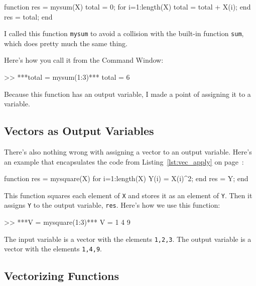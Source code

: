 
\begin{code}
function res = mysum(X)
    total = 0;
    for i=1:length(X)
        total = total + X(i);
    end
    res = total;
end
\end{code}

I called this function \lstinline{mysum} to avoid a collision with the built-in
function \lstinline{sum}, which does pretty much the same thing.


Here's how you call it from the Command Window:

\begin{code}
>> ***total = mysum(1:3)***
total = 6
\end{code}

Because this function has an output variable, I made a
point of assigning it to a variable.



\subsection{Vectors as Output Variables}

There's also nothing wrong with assigning a vector to an output
variable. Here's an example that encapsulates the code from
Listing~\ref{lst:vec_apply} on page~\pageref{lst:vec_apply}:

\begin{code}
function res = mysquare(X)
    for i=1:length(X)
        Y(i) = X(i)^2;
    end
    res = Y;
end
\end{code}

This function squares each element of \lstinline{X} and stores it as an element of \lstinline{Y}.  Then it assigns \lstinline{Y} to the output variable, \lstinline{res}.  Here's how we use this function:

\begin{code}
>> ***V = mysquare(1:3)***
V = 1     4     9
\end{code}

The input variable is a vector with the elements \lstinline{1,2,3}.  The output variable is a vector with the elements \lstinline{1,4,9}.




\subsection{Vectorizing Functions}

